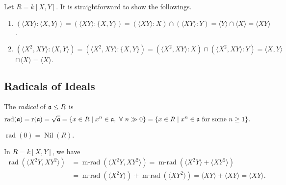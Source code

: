 \begin{example}\label{1.55}
    Let $R = k[X,Y]$. It is straightforward to show the followings.
    \begin{enumerate}
        \item $(\langle XY \rangle: \langle X,Y \rangle) = (\langle XY \rangle: \{X,Y\}) = (\langle XY \rangle: X) \cap (\langle XY \rangle : Y) = \langle Y \rangle \cap \langle X \rangle = \langle XY \rangle$.
        \item $(\langle X^2,XY \rangle: \langle X,Y \rangle) = (\langle X^2,XY \rangle: \{X,Y\}) = (\langle X^2,XY \rangle:X) \cap (\langle X^2,XY \rangle: Y) = \langle X,Y \rangle$ \\
            $\cap \langle X \rangle = \langle X \rangle$.
    \end{enumerate}
\end{example}

\subsection*{Radicals of Ideals}

\begin{definition}\label{1.56}
    The \emph{radical} of $\mathfrak{a} \leq R$ is 
    \[\operatorname{rad}(\mathfrak{a}) = \operatorname{r}(\mathfrak{a}) = \sqrt {\mathfrak{a}} = \{x \in R \mid x^n \in \mathfrak{a}, \ \forall \  n \gg 0\} = \{x \in R \mid x^n \in \mathfrak{a} \text{ for some }n \geq 1\}.\] 
\end{definition}

\begin{remark}
    $\operatorname{rad}(0) = \operatorname{Nil}(R)$.
\end{remark}

\begin{example}\label{1.57}
    In $R = k[X,Y]$, we have
    \begin{align*}
        \operatorname{rad}(\langle X^2Y,XY^2 \rangle) &= \operatorname{m-rad}(\langle X^2Y,XY^2 \rangle) = \operatorname{m-rad}(\langle X^2Y \rangle + \langle XY^2 \rangle) \\
                                                      &= \operatorname{m-rad}(\langle X^2Y \rangle) + \operatorname{m-rad}(\langle XY^2 \rangle) = \langle XY \rangle + \langle XY \rangle = \langle XY \rangle.
    \end{align*}
\end{example}

